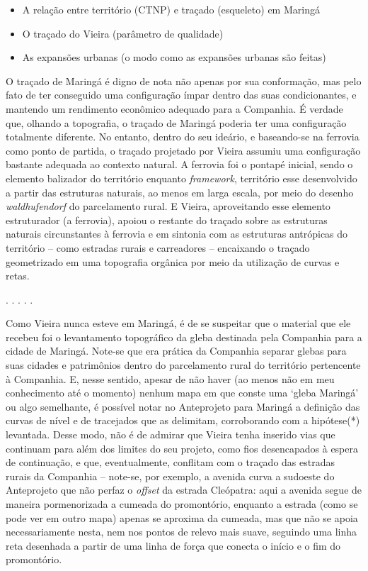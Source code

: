 \documentclass[12pt, a4paper]{book} %
\begin{document}
        
        

        \begin{itemize} %
            \item A relação entre território (CTNP) e traçado (esqueleto) em Maringá
            \item O traçado do Vieira (parâmetro de qualidade)
            \item As expansões urbanas (o modo como as expansões urbanas são feitas)
        \end{itemize}

        O traçado de Maringá é digno de nota não apenas por sua conformação, mas pelo fato de ter conseguido uma configuração ímpar dentro das suas condicionantes, e mantendo um rendimento econômico adequado para a Companhia. É verdade que, olhando a topografia, o traçado de Maringá poderia ter uma configuração totalmente diferente. No entanto, dentro do seu ideário, e baseando-se na ferrovia como ponto de partida, o traçado projetado por Vieira assumiu uma configuração bastante adequada ao contexto natural. A ferrovia foi o pontapé inicial, sendo o elemento balizador do território enquanto \textit{framework}, território esse desenvolvido a partir das estruturas naturais, ao menos em larga escala, por meio do desenho \textit{waldhufendorf} do parcelamento rural. E Vieira, aproveitando esse elemento estruturador (a ferrovia), apoiou o restante do traçado sobre as estruturas naturais circunstantes à ferrovia e em sintonia com as estruturas antrópicas do território – como estradas rurais e carreadores – encaixando o traçado geometrizado em uma topografia orgânica por meio da utilização de curvas e retas.

        \begin{center}
        . . . . .
        \end{center} 

        Como Vieira nunca esteve em Maringá, é de se suspeitar que o material que ele recebeu foi o levantamento topográfico da gleba destinada pela Companhia para a cidade de Maringá. Note-se que era prática da Companhia separar glebas para suas cidades e patrimônios dentro do parcelamento rural do território pertencente à Companhia. E, nesse sentido, apesar de não haver (ao menos não em meu conhecimento até o momento) nenhum mapa em que conste uma `gleba Maringá' ou algo semelhante, é possível notar no Anteprojeto para Maringá a definição das curvas de nível e de tracejados que as delimitam, corroborando com a hipótese(*) levantada. Desse modo, não é de admirar que Vieira tenha inserido vias que continuam para além dos limites do seu projeto, como fios desencapados à espera de continuação, e que, eventualmente, conflitam com o traçado das estradas rurais da Companhia – note-se, por exemplo, a avenida curva a sudoeste do Anteprojeto que não perfaz o \textit{offset} da estrada Cleópatra: aqui a avenida segue de maneira pormenorizada a cumeada do promontório, enquanto a estrada (como se pode ver em outro mapa) apenas se aproxima da cumeada, mas que não se apoia necessariamente nesta, nem nos pontos de relevo mais suave, seguindo uma linha reta desenhada a partir de uma linha de força que conecta o início e o fim do promontório.
\end{document}
